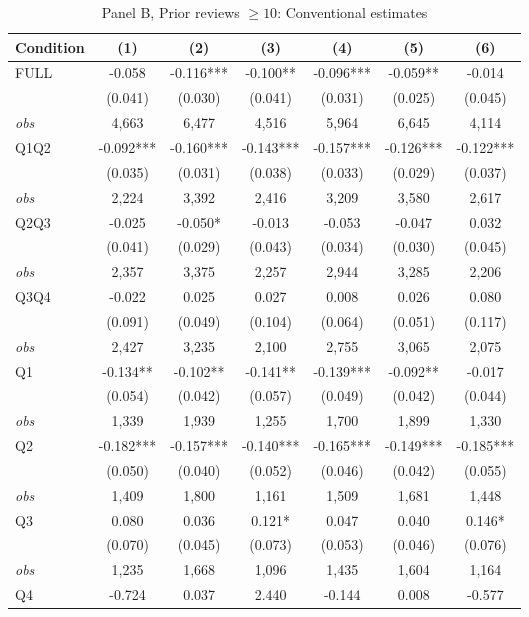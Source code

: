 \begin{table}[!htbp]
\centering
\caption{Panel B, Prior reviews $\geq 10$: Conventional estimates}
\label{tab:trim00:b:prior_reviews_ge10}
\small
\begin{tabular}{lcccccc}
\toprule
Condition & (1) & (2) & (3) & (4) & (5) & (6) \\
\midrule
FULL & -0.058 & -0.116*** & -0.100** & -0.096*** & -0.059** & -0.014 \\
 & (0.041) & (0.030) & (0.041) & (0.031) & (0.025) & (0.045) \\
\textit{obs} & 4,663 & 6,477 & 4,516 & 5,964 & 6,645 & 4,114 \\
Q1Q2 & -0.092*** & -0.160*** & -0.143*** & -0.157*** & -0.126*** & -0.122*** \\
 & (0.035) & (0.031) & (0.038) & (0.033) & (0.029) & (0.037) \\
\textit{obs} & 2,224 & 3,392 & 2,416 & 3,209 & 3,580 & 2,617 \\
Q2Q3 & -0.025 & -0.050* & -0.013 & -0.053 & -0.047 & 0.032 \\
 & (0.041) & (0.029) & (0.043) & (0.034) & (0.030) & (0.045) \\
\textit{obs} & 2,357 & 3,375 & 2,257 & 2,944 & 3,285 & 2,206 \\
Q3Q4 & -0.022 & 0.025 & 0.027 & 0.008 & 0.026 & 0.080 \\
 & (0.091) & (0.049) & (0.104) & (0.064) & (0.051) & (0.117) \\
\textit{obs} & 2,427 & 3,235 & 2,100 & 2,755 & 3,065 & 2,075 \\
Q1 & -0.134** & -0.102** & -0.141** & -0.139*** & -0.092** & -0.017 \\
 & (0.054) & (0.042) & (0.057) & (0.049) & (0.042) & (0.044) \\
\textit{obs} & 1,339 & 1,939 & 1,255 & 1,700 & 1,899 & 1,330 \\
Q2 & -0.182*** & -0.157*** & -0.140*** & -0.165*** & -0.149*** & -0.185*** \\
 & (0.050) & (0.040) & (0.052) & (0.046) & (0.042) & (0.055) \\
\textit{obs} & 1,409 & 1,800 & 1,161 & 1,509 & 1,681 & 1,448 \\
Q3 & 0.080 & 0.036 & 0.121* & 0.047 & 0.040 & 0.146* \\
 & (0.070) & (0.045) & (0.073) & (0.053) & (0.046) & (0.076) \\
\textit{obs} & 1,235 & 1,668 & 1,096 & 1,435 & 1,604 & 1,164 \\
Q4 & -0.724 & 0.037 & 2.440 & -0.144 & 0.008 & -0.577 \\

\end{tabular}
\end{table}
